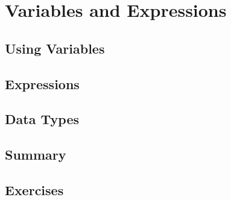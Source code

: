 \chapter{Variables and Expressions}


\section{Using Variables}


\section{Expressions}


\section{Data Types}

\section{Summary}


\section{Exercises}

